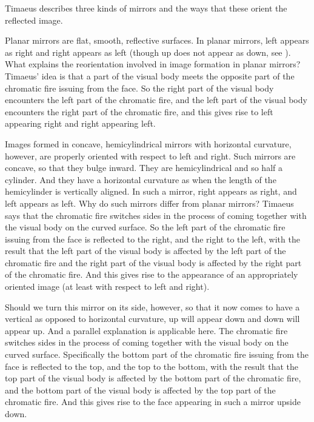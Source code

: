 Timaeus describes three kinds of mirrors and the ways that these orient the reflected image.

Planar mirrors are flat, smooth, reflective surfaces. In planar mirrors, left appears as right and right appears as left (though up does not appear as down, see \citealt{Block:1974tk}). What explains the reorientation involved in image formation in planar mirrors? Timae\-us' idea is that a part of the visual body meets the opposite part of the chromatic fire issuing from the face. So the right part of the visual body encounters the left part of the chromatic fire, and the left part of the visual body encounters the right part of the chromatic fire, and this gives rise to left appearing right and right appearing left.

Images formed in concave, hemicylindrical mirrors with horizontal curvature, however, are properly oriented with respect to left and right. Such mirrors are concave, so that they bulge inward. They are hemicylindrical and so half a cylinder. And they have a horizontal curvature as when the length of the hemicylinder is vertically aligned. In such a mirror, right appears as right, and left appears as left. Why do such mirrors differ from planar mirrors? Timaeus says that the chromatic fire switches sides in the process of coming together with the visual body on the curved surface. So the left part of the chromatic fire issuing from the face is reflected to the right, and the right to the left, with the result that the left part of the visual body is affected by the left part of the chromatic fire and the right part of the visual body is affected by the right part of the chromatic fire. And this gives rise to the appearance of an appropriately oriented image (at least with respect to left and right).

Should we turn this mirror on its side, however, so that it now comes to have a vertical as opposed to horizontal curvature, up will appear down and down will appear up. And a parallel explanation is applicable here. The chromatic fire switches sides in the process of coming together with the visual body on the curved surface. Specifically the bottom part of the chromatic fire issuing from the face is reflected to the top, and the top to the bottom, with the result that the top part of the visual body is affected by the bottom part of the chromatic fire, and the bottom part of the visual body is affected by the top part of the chromatic fire. And this gives rise to the face appearing in such a mirror upside down.

